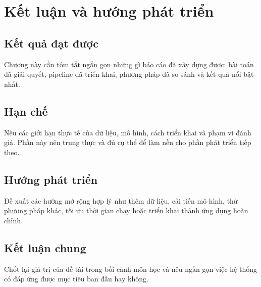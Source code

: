 \chapter{Kết luận và hướng phát triển}

\section{Kết quả đạt được}
Chương này cần tóm tắt ngắn gọn những gì báo cáo đã xây dựng được: bài toán đã giải quyết, pipeline đã triển khai, phương pháp đã so sánh và kết quả nổi bật nhất.

\section{Hạn chế}
Nêu các giới hạn thực tế của dữ liệu, mô hình, cách triển khai và phạm vi đánh giá. Phần này nên trung thực và đủ cụ thể để làm nền cho phần phát triển tiếp theo.

\section{Hướng phát triển}
Đề xuất các hướng mở rộng hợp lý như thêm dữ liệu, cải tiến mô hình, thử phương pháp khác, tối ưu thời gian chạy hoặc triển khai thành ứng dụng hoàn chỉnh.

\section{Kết luận chung}
Chốt lại giá trị của đề tài trong bối cảnh môn học và nêu ngắn gọn việc hệ thống có đáp ứng được mục tiêu ban đầu hay không.